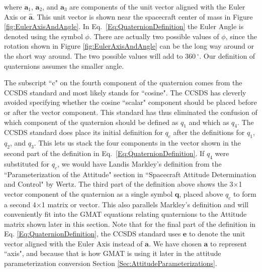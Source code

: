 %
where $\mathbf{a}_1$, $\mathbf{a}_2$, and $\mathbf{a}_3$ are components of the
unit vector aligned with the Euler Axis or $\mathbf{\hat{a}}$.  This unit vector
is shown near the spacecraft center of mass in Figure \ref{fig:EulerAxisAndAngle}.
In Eq.~\ref{Eq:QuaternionDefinition} the Euler Angle is denoted using the symbol
 $\phi$.  There are actually two possible values of $\phi$, since the rotation
shown in Figure \ref{fig:EulerAxisAndAngle} can be the long way around or the
short way around.  The two possible values will add to $360\,^{\circ}$.  Our
definition of quaternions assumes the smaller angle.

The subscript ``c" on the fourth component of the quaternion comes from the
CCSDS standard and most likely stands for ``cosine".  The CCSDS has cleverly
avoided specifying whether the cosine ``scalar" component should be placed
before or after the vector component.  This standard has thus eliminated the
confusion of which component of the quaternion should be defined as $q_1$ and
which as $q_4$.  The CCSDS standard does place its initial definition for $q_c$
after the definitions for $q_1$, $q_2$, and $q_3$.  This lets us stack the four
components in the vector shown in the second part of the definition in
Eq.~\ref{Eq:QuaternionDefinition}.  If $q_4$ were substituted for $q_c$, we would
have Landis Markley's definition from the ``Parameterization of the Attitude"
section in ``Spacecraft Attitude Determination and Control" by Wertz.  The third
part of the definition above shows the 3$\times$1 vector component of the
quaternion as a single symbol $\mathbf{q}$, placed above $q_c$ to form a second
4$\times$1 matrix or vector.  This also parallels Markley's definition and will
conveniently fit into the GMAT equations relating quaternions to the Attitude
matrix shown later in this section.  Note that for the final part of the
definition in Eq. \ref{Eq:QuaternionDefinition}, the CCSDS standard uses
$\mathbf{e}$ to denote the unit vector aligned with the Euler Axis instead of
$\mathbf{a}$.  We have chosen $\mathbf{a}$ to represent ``axis", and because
that is how GMAT is using it later in the attitude parameterization conversion
Section \ref{Sec:AttitudeParameterizations}.

